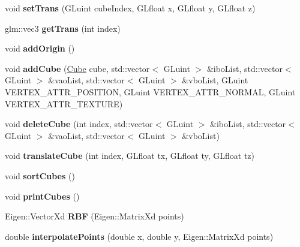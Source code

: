 \begin{DoxyCompactItemize}
\item 
\mbox{\label{classglimac_1_1CubeList_aa0c7fddc0f17997c0ed50010575ee19c}} 
void {\bfseries set\+Trans} (G\+Luint cube\+Index, G\+Lfloat x, G\+Lfloat y, G\+Lfloat z)
\item 
\mbox{\label{classglimac_1_1CubeList_a0cde495f2fd93b28028459fd07d7be5e}} 
glm\+::vec3 {\bfseries get\+Trans} (int index)
\item 
\mbox{\label{classglimac_1_1CubeList_a9ef8478602bab51965e25100bc109562}} 
void {\bfseries add\+Origin} ()
\item 
\mbox{\label{classglimac_1_1CubeList_ad95001321522ebdfc67dede69b11c3da}} 
void {\bfseries add\+Cube} (\hyperlink{classglimac_1_1Cube}{Cube} cube, std\+::vector$<$ G\+Luint $>$ \&ibo\+List, std\+::vector$<$ G\+Luint $>$ \&vao\+List, std\+::vector$<$ G\+Luint $>$ \&vbo\+List, G\+Luint V\+E\+R\+T\+E\+X\+\_\+\+A\+T\+T\+R\+\_\+\+P\+O\+S\+I\+T\+I\+ON, G\+Luint V\+E\+R\+T\+E\+X\+\_\+\+A\+T\+T\+R\+\_\+\+N\+O\+R\+M\+AL, G\+Luint V\+E\+R\+T\+E\+X\+\_\+\+A\+T\+T\+R\+\_\+\+T\+E\+X\+T\+U\+RE)
\item 
\mbox{\label{classglimac_1_1CubeList_af2820d63092fbba52ec8e1d22234b34f}} 
void {\bfseries delete\+Cube} (int index, std\+::vector$<$ G\+Luint $>$ \&ibo\+List, std\+::vector$<$ G\+Luint $>$ \&vao\+List, std\+::vector$<$ G\+Luint $>$ \&vbo\+List)
\item 
\mbox{\label{classglimac_1_1CubeList_ace7f18a7aab16f50e724eab7d66d27b2}} 
void {\bfseries translate\+Cube} (int index, G\+Lfloat tx, G\+Lfloat ty, G\+Lfloat tz)
\item 
\mbox{\label{classglimac_1_1CubeList_af6615c0db1a97fcae5df6f27de71b6d8}} 
void {\bfseries sort\+Cubes} ()
\item 
\mbox{\label{classglimac_1_1CubeList_a5c3e997708642903eb6b4c806de0cdf9}} 
void {\bfseries print\+Cubes} ()
\item 
\mbox{\label{classglimac_1_1CubeList_ab87f2ed50f1c7e0187c58bb17926234e}} 
Eigen\+::\+Vector\+Xd {\bfseries R\+BF} (Eigen\+::\+Matrix\+Xd points)
\item 
\mbox{\label{classglimac_1_1CubeList_a811e3f908710eb469fc681ec1a5f29c7}} 
double {\bfseries interpolate\+Points} (double x, double y, Eigen\+::\+Matrix\+Xd points)
\end{DoxyCompactItemize}
